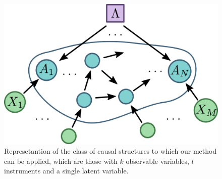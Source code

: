 \documentclass[letterpaper]{article}
\begin{document}
\begin{figure}[h]
    \centering
    \includegraphics[width=.9\columnwidth]{images/onelambda.pdf}
    \caption{Represetantion of the class of causal structures to which our
        method can be applied, which are those with $k$ observable variables, $l$
        instruments and a single latent variable.}
    \label{fig:onelambda}
\end{figure}
\end{document}
